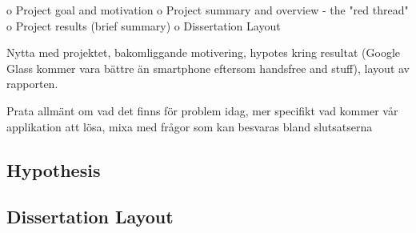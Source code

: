 o   Project goal and motivation
o   Project summary and overview - the "red thread"
o   Project results (brief summary)
o   Dissertation Layout

Nytta med projektet, bakomliggande motivering, hypotes kring resultat (Google Glass kommer vara bättre än smartphone eftersom handsfree and stuff), layout av rapporten.

Prata allmänt om vad det finns för problem idag, mer specifikt vad kommer vår applikation att lösa, mixa med frågor som kan besvaras bland slutsatserna

\subsection{Hypothesis}


\subsection{Dissertation Layout}
